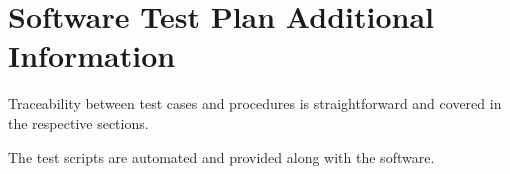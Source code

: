 
\chapter{Software Test Plan Additional Information}

Traceability between test cases and procedures is straightforward and covered in the respective sections.

The test scripts are automated and provided along with the software.
